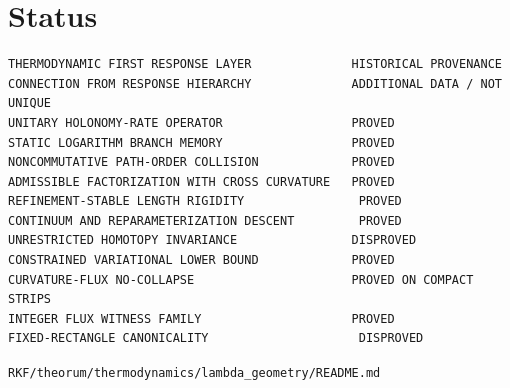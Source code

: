 \hypertarget{status}{%
\section{Status}\label{status}}

\begin{verbatim}
THERMODYNAMIC FIRST RESPONSE LAYER              HISTORICAL PROVENANCE
CONNECTION FROM RESPONSE HIERARCHY              ADDITIONAL DATA / NOT UNIQUE
UNITARY HOLONOMY-RATE OPERATOR                  PROVED
STATIC LOGARITHM BRANCH MEMORY                  PROVED
NONCOMMUTATIVE PATH-ORDER COLLISION             PROVED
ADMISSIBLE FACTORIZATION WITH CROSS CURVATURE   PROVED
REFINEMENT-STABLE LENGTH RIGIDITY                PROVED
CONTINUUM AND REPARAMETERIZATION DESCENT         PROVED
UNRESTRICTED HOMOTOPY INVARIANCE                DISPROVED
CONSTRAINED VARIATIONAL LOWER BOUND             PROVED
CURVATURE-FLUX NO-COLLAPSE                      PROVED ON COMPACT STRIPS
INTEGER FLUX WITNESS FAMILY                     PROVED
FIXED-RECTANGLE CANONICALITY                     DISPROVED
\end{verbatim}

\begin{flushright}\small\texttt{RKF/theorum/thermodynamics/lambda\_geometry/README.md}\end{flushright}

